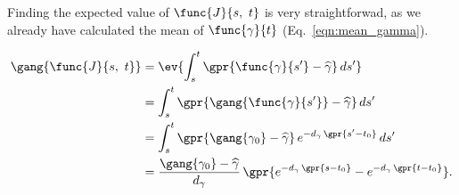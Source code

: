 Finding the expected value of $\func{J}{s,\ t}$ is very straightforwad, as we already have calculated the mean of $\func{\gamma}{t}$ (Eq.~\ref{eqn:mean_gamma}). 

\begin{align}
    \gang{\func{J}{s,\ t}} &= \ev{\int_{s}^{t} \gpr{\func{\gamma}{s'} - \widehat{\gamma}}\,ds'} \nonumber \\
    	&= \int_{s}^{t} \gpr{\gang{\func{\gamma}{s'}} - \widehat{\gamma}}\,ds' \nonumber \\
    	&= \int_{s}^{t} \gpr{\gang{\gamma_0} - \widehat{\gamma}}\,e^{-d_{\gamma}\,\gpr{s' - t_0}}\,ds' \nonumber \\
    	&= \frac{\gang{\gamma_0} - \widehat{\gamma}}{d_{\gamma}}\,\gpr{e^{-d_{\gamma}\,\gpr{s - t_0}} - e^{-d_{\gamma}\,\gpr{t - t_0}}}. \label{eqn:mean_Jst}
\end{align}

